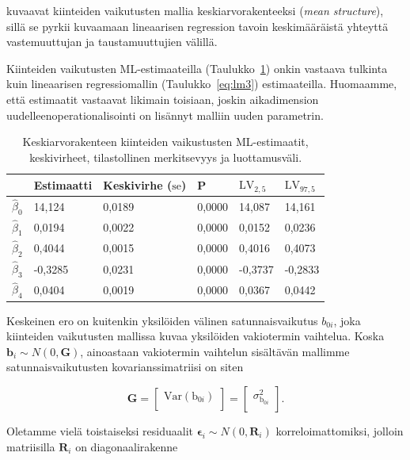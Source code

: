 \documentclass[finnish]{docopts}
\begin{document}
\cite{west14} kuvaavat kiinteiden vaikutusten mallia keskiarvorakenteeksi (\textit{mean structure}), sillä se pyrkii kuvaamaan lineaarisen regression tavoin keskimääräistä yhteyttä vastemuuttujan ja taustamuuttujien välillä.

Kiinteiden vaikutusten ML-estimaateilla (Taulukko~\ref{table:lme0}) onkin vastaava tulkinta kuin lineaarisen regressiomallin (Taulukko~\ref{eq:lm3}) estimaateilla. Huomaamme, että estimaatit vastaavat likimain toisiaan, joskin aikadimension uudelleenoperationalisointi on lisännyt malliin uuden parametrin.\\

\begin{table}[H]
\centering
\begin{tabular}{llllll}
\toprule
  & Estimaatti & Keskivirhe ($\text{se}$) & P & $\text{LV}_{2,5}$ & $\text{LV}_{97,5}$\\
\midrule
$\hat{\beta}_0$ & 14,124 & 0,0189 & 0,0000 & 14,087 & 14,161\\
$\hat{\beta}_1$ & 0,0194 & 0,0022 & 0,0000 & 0,0152 & 0,0236\\
$\hat{\beta}_2$ & 0,4044 & 0,0015 & 0,0000 & 0,4016 & 0,4073\\
$\hat{\beta}_3$ & -0,3285 & 0,0231 & 0,0000 & -0,3737 & -0,2833\\
$\hat{\beta}_4$ & 0,0404 & 0,0019 & 0,0000 & 0,0367 & 0,0442\\
\bottomrule
\end{tabular}
\caption{Keskiarvorakenteen kiinteiden vaikustusten ML-estimaatit, keskivirheet, tilastollinen merkitsevyys ja luottamusväli.}
\label{table:lme0}
\end{table}

Keskeinen ero on kuitenkin yksilöiden välinen satunnaisvaikutus $b_{0i}$, joka kiinteiden vaikutusten mallissa kuvaa yksilöiden vakiotermin vaihtelua. Koska $\bm{b}_i \sim N(0,\bm{G})$, ainoastaan vakiotermin vaihtelun sisältävän mallimme satunnaisvaikutusten kovarianssimatriisi on siten

$$
\bm{G} = 
\begin{bmatrix}
\text{Var}({\text{b}_{0i}})\\
\end{bmatrix} =
\begin{bmatrix}
\sigma^2_{\text{b}_{0i}}\\
\end{bmatrix}.
$$

Oletamme vielä toistaiseksi residuaalit $\bm{\epsilon}_i \sim N(0, \bm{R}_i)$ korreloimattomiksi, jolloin matriisilla $\bm{R}_i$ on diagonaalirakenne
\end{document}
